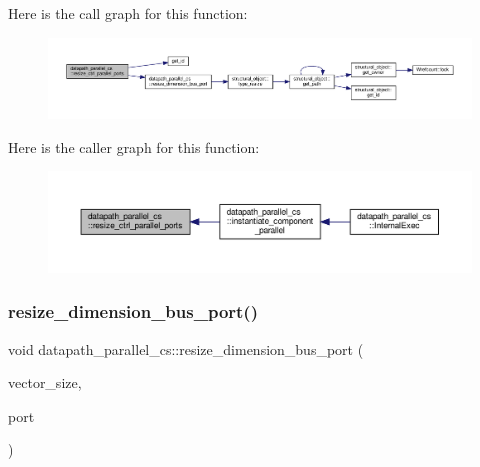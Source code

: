 Here is the call graph for this function\+:
\nopagebreak
\begin{figure}[H]
\begin{center}
\leavevmode
\includegraphics[width=350pt]{d7/d60/classdatapath__parallel__cs_a242291d6433556127880f7baab96c641_cgraph}
\end{center}
\end{figure}
Here is the caller graph for this function\+:
\nopagebreak
\begin{figure}[H]
\begin{center}
\leavevmode
\includegraphics[width=350pt]{d7/d60/classdatapath__parallel__cs_a242291d6433556127880f7baab96c641_icgraph}
\end{center}
\end{figure}
\mbox{\label{classdatapath__parallel__cs_ae35b3e7cd2b03df2f26fa6a2a1c0ee97}} 
\subsubsection{\texorpdfstring{resize\+\_\+dimension\+\_\+bus\+\_\+port()}{resize\_dimension\_bus\_port()}}
{\footnotesize\ttfamily void datapath\+\_\+parallel\+\_\+cs\+::resize\+\_\+dimension\+\_\+bus\+\_\+port (\begin{DoxyParamCaption}\item[{unsigned int}]{vector\+\_\+size,  }\item[{\hyperlink{structural__objects_8hpp_a8ea5f8cc50ab8f4c31e2751074ff60b2}{structural\+\_\+object\+Ref}}]{port }\end{DoxyParamCaption})\hspace{0.3cm}{\ttfamily [protected]}}



